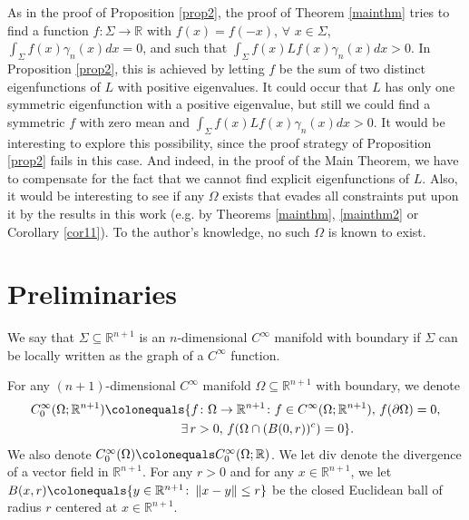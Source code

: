 \documentclass[12pt,reqno]{amsart}
\theoremstyle{definition}
\renewcommand{\subset}{\subseteq}
\newcommand{\vnormt}[1]{\left\|#1\right\|}    %
\newcommand{\R}{\mathbb{R}}
\newcommand{\snote}[1]{\textcolor{red}{\small {\textbf{(}#1\textbf{) }}}}
\newcommand{\sdimn}{n}
\newcommand{\adimn}{n+1}
\begin{document}
As in the proof of Proposition \ref{prop2}, the proof of Theorem \ref{mainthm} tries to find a function $f\colon\Sigma\to\R$ with $f(x)=f(-x)$, $\forall$ $x\in\Sigma$, $\int_{\Sigma}f(x)\gamma_{\sdimn}(x)dx=0$, and such that $\int_{\Sigma}f(x)Lf(x)\gamma_{\sdimn}(x)dx>0$.  In Proposition \ref{prop2}, this is achieved by letting $f$ be the sum of two distinct eigenfunctions of $L$ with positive eigenvalues.  It could occur that $L$ has only one symmetric eigenfunction with a positive eigenvalue, but still we could find a symmetric $f$ with zero mean and $\int_{\Sigma}f(x)Lf(x)\gamma_{\sdimn}(x)dx>0$.  It would be interesting to explore this possibility, since the proof strategy of Proposition \ref{prop2} fails in this case.  And indeed, in the proof of the Main Theorem, we have to compensate for the fact that we cannot find explicit eigenfunctions of $L$.  Also, it would be interesting to see if any $\Omega$ exists that evades all constraints put upon it by the results in this work (e.g. by Theorems \ref{mainthm}, \ref{mainthm2} or Corollary \ref{cor11}).  To the author's knowledge, no such $\Omega$ is known to exist.

\section{Preliminaries}\label{secpre}

We say that $\Sigma\subset\R^{\adimn}$ is an $\sdimn$-dimensional $C^{\infty}$ manifold with boundary if $\Sigma$ can be locally written as the graph of a $C^{\infty}$ function.


For any $(\adimn)$-dimensional $C^{\infty}$ manifold $\Omega\subset\R^{\adimn}$ with boundary, we denote
\begin{equation}\label{c0def}
\begin{aligned}
C_{0}^{\infty}(\Omega;\R^{\adimn})
&\colonequals\{f\colon \Omega\to\R^{\adimn}\colon f\in C^{\infty}(\Omega;\R^{\adimn}),\, f(\partial \Omega)=0,\\
&\qquad\qquad\qquad\exists\,r>0,\,f(\Omega\cap(B(0,r))^{c})=0\}.
\end{aligned}
\end{equation}
We also denote $C_{0}^{\infty}(\Omega)\colonequals C_{0}^{\infty}(\Omega;\R)$.  We let $\mathrm{div}$ denote the divergence of a vector field in $\R^{\adimn}$.  For any $r>0$ and for any $x\in\R^{\adimn}$, we let $B(x,r)\colonequals\{y\in\R^{\adimn}\colon\vnormt{x-y}\leq r\}$ be the closed Euclidean ball of radius $r$ centered at $x\in\R^{\adimn}$.
\end{document}
